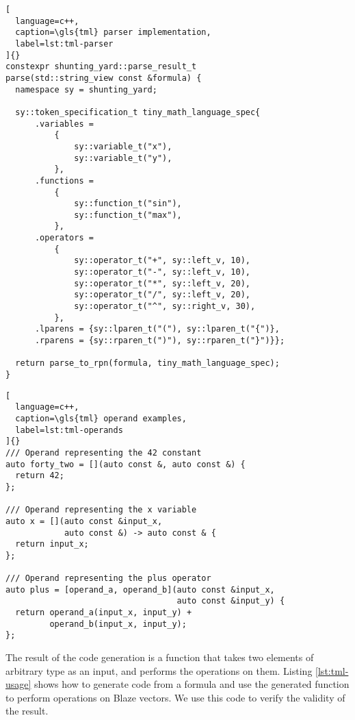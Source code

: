 \documentclass[../main]{subfiles}
\begin{document}
\begin{lstlisting}[
  language=c++,
  caption=\gls{tml} parser implementation,
  label=lst:tml-parser
]{}
constexpr shunting_yard::parse_result_t
parse(std::string_view const &formula) {
  namespace sy = shunting_yard;

  sy::token_specification_t tiny_math_language_spec{
      .variables =
          {
              sy::variable_t("x"),
              sy::variable_t("y"),
          },
      .functions =
          {
              sy::function_t("sin"),
              sy::function_t("max"),
          },
      .operators =
          {
              sy::operator_t("+", sy::left_v, 10),
              sy::operator_t("-", sy::left_v, 10),
              sy::operator_t("*", sy::left_v, 20),
              sy::operator_t("/", sy::left_v, 20),
              sy::operator_t("^", sy::right_v, 30),
          },
      .lparens = {sy::lparen_t("("), sy::lparen_t("{")},
      .rparens = {sy::rparen_t(")"), sy::rparen_t("}")}};

  return parse_to_rpn(formula, tiny_math_language_spec);
}
\end{lstlisting}

\begin{lstlisting}[
  language=c++,
  caption=\gls{tml} operand examples,
  label=lst:tml-operands
]{}
/// Operand representing the 42 constant
auto forty_two = [](auto const &, auto const &) {
  return 42;
};

/// Operand representing the x variable
auto x = [](auto const &input_x,
            auto const &) -> auto const & {
  return input_x;
};

/// Operand representing the plus operator
auto plus = [operand_a, operand_b](auto const &input_x,
                                   auto const &input_y) {
  return operand_a(input_x, input_y) +
         operand_b(input_x, input_y);
};
\end{lstlisting}

\clearpage%

The result of the code generation is a function that takes two elements of
arbitrary type as an input, and performs the operations on them.
Listing \ref{lst:tml-usage} shows how to generate code from a formula
and use the generated function to perform operations on Blaze vectors.
We use this code to verify the validity of the result.
\end{document}
